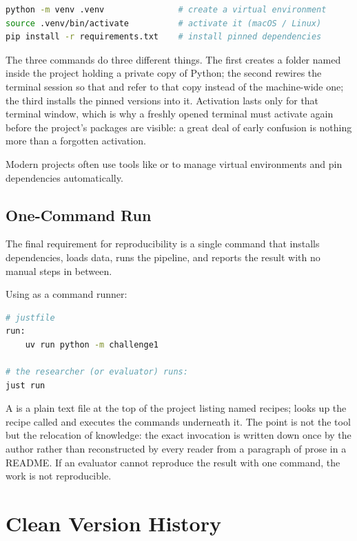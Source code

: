 \begin{lstlisting}[language=bash]
python -m venv .venv               # create a virtual environment
source .venv/bin/activate          # activate it (macOS / Linux)
pip install -r requirements.txt    # install pinned dependencies
\end{lstlisting}

The three commands do three different things.
The first creates a folder named  inside the project holding a private copy of Python;
the second rewires the terminal session so that  and  refer to that copy instead of the machine-wide one;
the third installs the pinned versions into it.
Activation lasts only for that terminal window, which is why a freshly opened terminal must activate again before the project's packages are visible: a great deal of early confusion is nothing more than a forgotten activation.

Modern projects often use tools like  or  to manage virtual environments and pin dependencies automatically.

\subsection{One-Command Run}

The final requirement for reproducibility is a single command that installs dependencies, loads data, runs the pipeline, and reports the result with no manual steps in between.

\begin{example}
Using  as a command runner:
\begin{lstlisting}[language=bash]
# justfile
run:
    uv run python -m challenge1

# the researcher (or evaluator) runs:
just run
\end{lstlisting}
A  is a plain text file at the top of the project listing named recipes;  looks up the recipe called  and executes the commands underneath it.
The point is not the tool but the relocation of knowledge: the exact invocation is written down once by the author rather than reconstructed by every reader from a paragraph of prose in a README.
If an evaluator cannot reproduce the result with one command, the work is not reproducible.
\end{example}

\section{Clean Version History}

